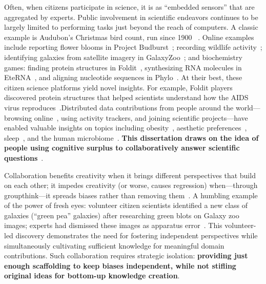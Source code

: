 Often, when citizens participate in science, it is as “embedded sensors” that 
are aggregated by experts. Public involvement in scientific endeavors continues
to be largely limited to performing tasks just beyond the reach of computers.
A classic example is Audubon’s Christmas bird count, run since 1900
~\cite{Audubon2016}. Online examples include reporting flower blooms in
Project Budburst~\cite{BoulderColorado2016}; recording wildlife activity~\cite{Faridani2009a};
identifying galaxies from satellite imagery in GalaxyZoo~\cite{Zooniverse2007}; 
and biochemistry games: finding protein structures in Foldit~\cite{Cooper2010}, 
synthesizing RNA molecules in EteRNA~\cite{Lee2014}, and aligning 
nucleotide sequences in Phylo~\cite{Kawrykow2012}. At their
best, these citizen science platforms yield novel insights.
For example, Foldit players discovered protein structures
that helped scientists understand how the AIDS virus reproduces~\cite{Coren2011}.Distributed 
data contributions from people around the world—browsing online~\cite{Coviello2014}, using activity trackers, and joining scientific projects—have enabled valuable insights on topics including 
obesity~\cite{Althoff2017}, aesthetic preferences~\cite{Reinecke2014a}, sleep~\cite{F.lux2019}, and the human microbiome~\cite{McDonald2018a}. \textbf{This dissertation 
draws on the idea of people using  cognitive surplus to collaboratively answer scientific questions}~\cite{Bonney2009}.


Collaboration benefits creativity when it brings different
 perspectives that build on each other; it impedes creativity (or worse, causes regression) 
when—through groupthink—it spreads biases rather than removing them~\cite{starbird2014rumors}. 
A humbling example of the power of fresh eyes: volunteer citizen scientists identified a new class of 
galaxies (“green pea” galaxies) after researching green blots on Galaxy zoo images; 
experts had dismissed these images as apparatus error~\cite{cardamone2009galaxy}.
This volunteer-led discovery demonstrates the need for fostering independent perspectives 
while simultaneously cultivating sufficient knowledge for meaningful domain contributions. 
Such collaboration requires strategic isolation: \textbf {providing just enough scaffolding to keep 
biases independent, while not stifling original ideas for bottom-up knowledge creation}.


